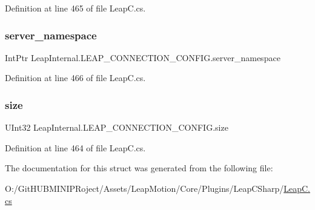 Definition at line 465 of file Leap\+C.\+cs.

\mbox{\label{struct_leap_internal_1_1_l_e_a_p___c_o_n_n_e_c_t_i_o_n___c_o_n_f_i_g_a1bf89a95e26e6ddc466744ce0661a18a}} 
\subsubsection{\texorpdfstring{server\_namespace}{server\_namespace}}
{\footnotesize\ttfamily Int\+Ptr Leap\+Internal.\+L\+E\+A\+P\+\_\+\+C\+O\+N\+N\+E\+C\+T\+I\+O\+N\+\_\+\+C\+O\+N\+F\+I\+G.\+server\+\_\+namespace}



Definition at line 466 of file Leap\+C.\+cs.

\mbox{\label{struct_leap_internal_1_1_l_e_a_p___c_o_n_n_e_c_t_i_o_n___c_o_n_f_i_g_a4746dd9bc79ad1934f2801e68e38d9d1}} 
\subsubsection{\texorpdfstring{size}{size}}
{\footnotesize\ttfamily U\+Int32 Leap\+Internal.\+L\+E\+A\+P\+\_\+\+C\+O\+N\+N\+E\+C\+T\+I\+O\+N\+\_\+\+C\+O\+N\+F\+I\+G.\+size}



Definition at line 464 of file Leap\+C.\+cs.



The documentation for this struct was generated from the following file\+:\begin{DoxyCompactItemize}
\item 
O\+:/\+Git\+H\+U\+B\+M\+I\+N\+I\+P\+Roject/\+Assets/\+Leap\+Motion/\+Core/\+Plugins/\+Leap\+C\+Sharp/\mbox{\hyperlink{_leap_c_8cs}{Leap\+C.\+cs}}\end{DoxyCompactItemize}
